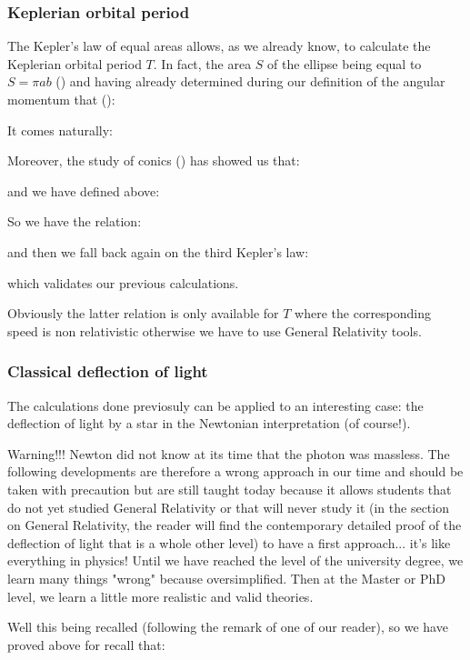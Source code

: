 	\pagebreak
	\subsubsection{Keplerian orbital period}
	The Kepler's law of equal areas allows, as we already know, to calculate the Keplerian orbital period $T$. In fact, the area $S$ of the ellipse being equal to $S=\pi a b$ () and having already determined during our definition of the angular momentum that ():
	 
	It comes naturally:
	
	Moreover, the study of conics () has showed us that:
	
	and we have defined above:
	
	So we have the relation:
	
	and then we fall back again on the third Kepler's law:
	
	which validates our previous calculations.
	
	Obviously the latter relation is only available for $T$ where the corresponding speed is non relativistic otherwise we have to use General Relativity tools.

	\pagebreak
	\subsubsection{Classical deflection of light}
	The calculations done previosuly can be applied to an interesting case: the deflection of light by a star in the Newtonian interpretation (of course!).

	Warning!!! Newton did not know at its time that the photon was massless. The following developments are therefore a wrong approach in our time and should be taken with precaution but are still taught today because it allows students that do not yet studied General Relativity or that will never study it  (in the section on General Relativity, the reader will find the contemporary detailed proof of the deflection of light that is a whole other level) to have a first approach... it's like everything in physics! Until we have reached the level of the university degree, we learn many things "wrong" because oversimplified. Then at the Master or PhD level, we learn a little more realistic and valid theories.

	Well this being recalled (following the remark of one of our reader), so we have proved above for recall that:
	
